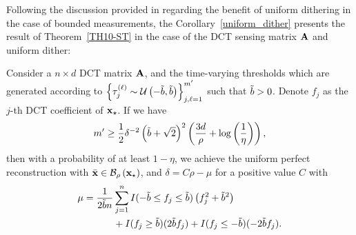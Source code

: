 \documentclass[12pt,draftcls,onecolumn]{IEEEtran}
\def\bt{\Tilde{b}}
\begin{document}
Following the discussion provided in \cite{xu2020quantized} regarding the benefit of uniform dithering in the case of bounded measurements, the Corollary~\ref{uniform_dither} presents the result of Theorem~\ref{TH10-ST} in the case of the DCT sensing matrix $\mathbf{A}$ and uniform dither:
\begin{corollary}
\label{uniform_dither}
Consider 
a $n\times d$ DCT matrix $\mathbf{A}$, and the time-varying thresholds which
are generated according to $\left\{\tau^{(\ell)}_{j}\sim \mathcal{U}\left(-\bt,\bt\right)\right\}_{j,\ell=1}^{m^{\prime}}$ such that $\bt>0$. 
Denote $f_j$ as the $j$-th DCT coefficient of $\mathbf{x}_{\star}$.
If we have
\begin{equation}
\label{kvm_3}
m^{\prime}\geq \frac{1}{2}\delta^{-2}\left(\bt+\sqrt{2}\right)^2\left(\frac{3d}{\rho}+\log\left(\frac{1}{\eta}\right)\right),%
\end{equation}
then with a probability of at least $1-\eta$, we achieve the uniform perfect reconstruction with
$\bar{\mathbf{x}}\in\mathcal{B}_\rho\left(\mathbf{x}_{\star}\right)$,
and $\delta=C\rho-\mu$ for a positive value $C$ with
\begin{equation}
\label{kvm_4}
\begin{aligned}
\mu=\frac{1}{2\bt n}&\sum_{j=1}^{n}I(-\bt\leq f_j\leq\bt)\left(f_{j}^2+\bt^2\right)\\&+I(f_j\geq\bt)(2\bt f_j)+I(f_j\leq-\bt)(-2\bt f_j).
\end{aligned}
\end{equation}
\end{corollary}
\end{document}
